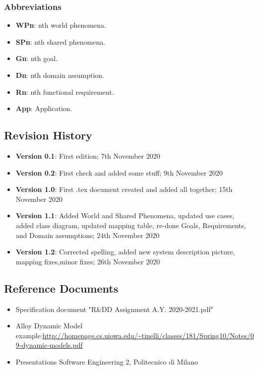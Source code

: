 \subsubsection{Abbreviations}
\begin{itemize}
	\item \textbf{WPn}: nth world phenomena.
	\item \textbf{SPn}: nth shared phenomena.
	\item \textbf{Gn}: nth goal.
	\item \textbf{Dn}: nth domain assumption.
	\item \textbf{Rn}: nth functional requirement.
	\item \textbf{App}: Application.
\end{itemize}

\newpage
\subsection{Revision History}
\begin{itemize}
	\item \textbf{Version 0.1}: First edition; 7th November 2020
	\item \textbf{Version 0.2}: First check and added some stuff; 9th November 2020
	\item \textbf{Version 1.0}: First .tex document created and added all together; 15th November 2020
	\item \textbf{Version 1.1}: Added World and Shared Phenomena, updated use cases, added class diagram, updated mapping table, re-done Goals, Requirements, and Domain assumptions; 24th November 2020
	\item \textbf{Version 1.2}: Corrected spelling, added new system description picture, mapping fixes,minor fixes; 26th November 2020
\end{itemize}

\newpage
\subsection{Reference Documents}
\begin{itemize}
	\item Specification document "R\&DD Assignment A.Y. 2020-2021.pdf"
	\item Alloy Dynamic Model example:\url{http://homepage.cs.uiowa.edu/~tinelli/classes/181/Spring10/Notes/09-dynamic-models.pdf}
	\item Presentations Software Engineering 2, Politecnico di Milano
\end{itemize}

